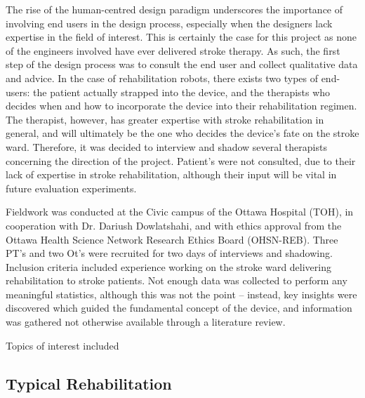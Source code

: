 \documentclass[12pt]{report}
\begin{document}
%
	
	The rise of the human-centred design paradigm underscores the importance of involving end users in the design process, especially when the designers lack expertise in the field of interest. This is certainly the case for this project as none of the engineers involved have ever delivered stroke therapy. As such, the first step of the design process was to consult the end user and collect qualitative data and advice. In the case of rehabilitation robots, there exists two types of end-users: the patient actually strapped into the device, and the therapists who decides when and how to incorporate the device into their rehabilitation regimen. The therapist, however, has greater expertise with stroke rehabilitation in general, and will ultimately be the one who decides the device's fate on the stroke ward. Therefore, it was decided to interview and shadow several therapists concerning the direction of the project. Patient's were not consulted, due to their lack of expertise in stroke rehabilitation, although their input will be vital in future evaluation experiments. 
	
	Fieldwork was conducted at the Civic campus of the Ottawa Hospital (TOH), in cooperation with Dr. Dariush Dowlatshahi, and with ethics approval from the Ottawa Health Science Network Research Ethics Board (OHSN-REB). Three PT's and two Ot's were recruited for two days of interviews and shadowing. Inclusion criteria included experience working on the stroke ward delivering rehabilitation to stroke patients. Not enough data was collected to perform any meaningful statistics, although this was not the point -- instead, key insights were discovered which guided the fundamental concept of the device, and information was gathered not otherwise available through a literature review. 
	
	Topics of interest included 
	
	
	
	
	
	
	
	\subsection{Typical Rehabilitation}
	
\end{document}
